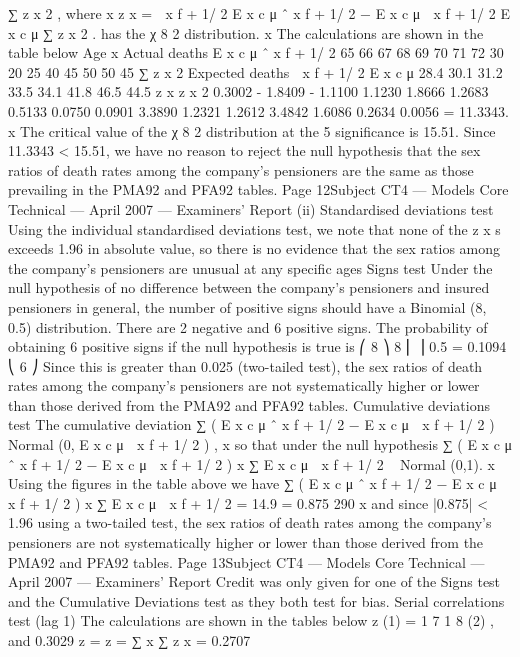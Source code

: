\documentclass[a4paper,12pt]{article}
\begin{document}
\begin{enumerate}
∑ z x 2 , where
x
z x =
 x f + 1/ 2
E x c μ ˆ x f + 1/ 2 − E x c μ
 x f + 1/ 2
E x c μ
∑ z x 2
.
has the χ 8 2 distribution.
x
The calculations are shown in the table below
Age
x Actual
deaths
E x c μ ˆ x f + 1/ 2
65
66
67
68
69
70
71
72 30
20
25
40
45
50
50
45
∑ z x 2
Expected
deaths
 x f + 1/ 2
E x c μ
28.4
30.1
31.2
33.5
34.1
41.8
46.5
44.5
z x z x 2
0.3002
- 1.8409
- 1.1100
1.1230
1.8666
1.2683
0.5133
0.0750 0.0901
3.3890
1.2321
1.2612
3.4842
1.6086
0.2634
0.0056
= 11.3343.
x
The critical value of the χ 8 2 distribution at the 5%
significance is 15.51.
Since 11.3343 < 15.51, we have no reason to reject the null hypothesis that the
sex ratios of death rates among the company’s pensioners are the same as
those prevailing in the PMA92 and PFA92 tables.
Page 12Subject CT4 — Models Core Technical — April 2007 — Examiners’ Report
(ii)
Standardised deviations test
Using the individual standardised deviations test, we note that none of the z x s
exceeds 1.96 in absolute value, so there is no evidence that the sex ratios
among the company’s pensioners are unusual at any specific ages
Signs test
Under the null hypothesis of no difference between the company’s pensioners
and insured pensioners in general, the number of positive signs should have a
Binomial (8, 0.5) distribution.
There are 2 negative and 6 positive signs.
The probability of obtaining 6 positive signs if the null hypothesis is true is
⎛ 8 ⎞ 8
⎜ ⎟ 0.5 = 0.1094
⎝ 6 ⎠
Since this is greater than 0.025 (two-tailed test), the sex ratios of death rates
among the company’s pensioners are not systematically higher or lower than
those derived from the PMA92 and PFA92 tables.
Cumulative deviations test
The cumulative deviation
∑ ( E x c μ ˆ x f + 1/ 2 − E x c μ  x f + 1/ 2 ) ~ Normal (0, E x c μ  x f + 1/ 2 ) ,
x
so that under the null hypothesis
∑ ( E x c μ ˆ x f + 1/ 2 − E x c μ  x f + 1/ 2 )
x
∑ E x c μ  x f + 1/ 2
~ Normal (0,1).
x
Using the figures in the table above we have
∑ ( E x c μ ˆ x f + 1/ 2 − E x c μ  x f + 1/ 2 )
x
∑ E x c μ  x f + 1/ 2
=
14.9
= 0.875
290
x
and since |0.875| < 1.96 using a two-tailed test, the sex ratios of death rates
among the company’s pensioners are not systematically higher or lower than
those derived from the PMA92 and PFA92 tables.
Page 13Subject CT4 — Models Core Technical — April 2007 — Examiners’ Report
Credit was only given for one of the Signs test and the Cumulative Deviations
test as they both test for bias.
Serial correlations test (lag 1)
The calculations are shown in the tables below
z (1) =
1 7
1 8
(2)
,
and
0.3029
z
=
z
=
∑ x
∑ z x = 0.2707

\end{enumerate}
\end{document}
